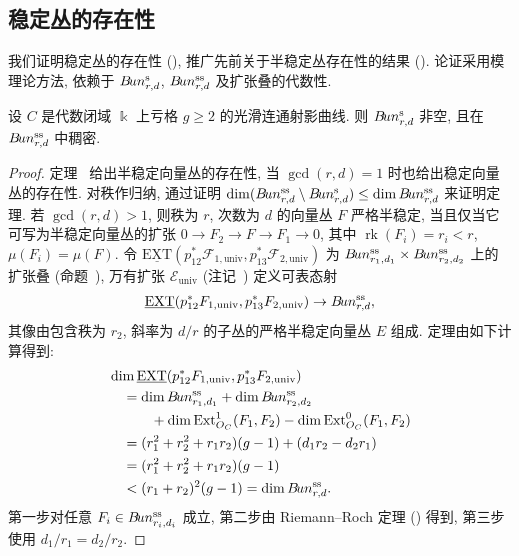 \subsection{稳定丛的存在性}\label{src:9.2.5-subsection}
我们证明稳定丛的存在性 (), 推广先前关于半稳定丛存在性的结果 (). 论证采用模理论方法, 依赖于 $B\!un_{r,d}^{\mathrm s}$, $B\!un_{r,d}^{\mathrm{ss}}$ 及扩张叠的代数性.
\begin{theorem}[稳定丛的存在性]\label{src:9.2.16}
设 $C$ 是代数闭域 $\Bbbk$ 上亏格 $g\geq2$ 的光滑连通射影曲线. 则 $B\!un_{r,d}^{\mathrm s}$ 非空, 且在 $B\!un_{r,d}^{\mathrm{ss}}$ 中稠密.
\end{theorem}
\begin{proof}
定理~ 给出半稳定向量丛的存在性, 当 $\gcd(r,d)=1$ 时也给出稳定向量丛的存在性. 对秩作归纳, 通过证明 $\dim(B\!un_{r,d}^{\mathrm{ss}}\setminus B\!un_{r,d}^{\mathrm s})\leq\dim B\!un_{r,d}^{\mathrm{ss}}$ 来证明定理. 若 $\gcd(r,d)>1$, 则秩为 $r$, 次数为 $d$ 的向量丛 $F$ 严格半稳定, 当且仅当它可写为半稳定向量丛的扩张 $0\to F_2\to F\to F_1\to0$, 其中 $\operatorname{rk}(F_i)=r_i<r$, $\mu(F_i)=\mu(F)$. 令 $\underline{\mathrm{EXT}}(p_{12}^*\mathcal F_{1,\mathrm{univ}},p_{13}^*\mathcal F_{2,\mathrm{univ}})$ 为 $B\!un_{r_1,d_1}^{\mathrm{ss}}\times B\!un_{r_2,d_2}^{\mathrm{ss}}$ 上的扩张叠 (命题~), 万有扩张 $\mathcal E_{\mathrm{univ}}$ (注记~) 定义可表态射
\[
\underline{\mathrm{EXT}}(p_{12}^*F_{1,\mathrm{univ}},p_{13}^*F_{2,\mathrm{univ}})\to B\!un_{r,d}^{\mathrm{ss}},
\]
其像由包含秩为 $r_2$, 斜率为 $d/r$ 的子丛的严格半稳定向量丛 $E$ 组成. 定理由如下计算得到:
\[
\begin{aligned}
&\dim\underline{\mathrm{EXT}}(p_{12}^*F_{1,\mathrm{univ}},p_{13}^*F_{2,\mathrm{univ}})\\
&\quad=\dim B\!un_{r_1,d_1}^{\mathrm{ss}}+\dim B\!un_{r_2,d_2}^{\mathrm{ss}}\\
&\qquad\quad+\dim\operatorname{Ext}_{O_C}^1(F_1,F_2)-\dim\operatorname{Ext}_{O_C}^0(F_1,F_2)\\
&\quad=(r_1^2+r_2^2+r_1r_2)(g-1)+(d_1r_2-d_2r_1)\\
&\quad=(r_1^2+r_2^2+r_1r_2)(g-1)\\
&\quad<(r_1+r_2)^2(g-1)=\dim B\!un_{r,d}^{\mathrm{ss}}.
\end{aligned}
\]
第一步对任意 $F_i\in B\!un_{r_i,d_i}^{\mathrm{ss}}$ 成立, 第二步由 Riemann--Roch 定理 () 得到, 第三步使用 $d_1/r_1=d_2/r_2$.
\end{proof}
